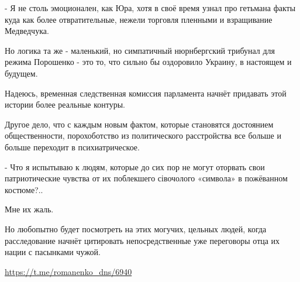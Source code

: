 - Я не столь эмоционален, как Юра, хотя в своё время узнал про гетьмана факты
куда как более отвратительные, нежели торговля пленными и взращивание
Медведчука.

Но логика та же - маленький, но симпатичный нюрнбергский трибунал для режима
Порошенко - это то, что сильно бы оздоровило Украину, в настоящем и будущем.

Надеюсь, временная следственная комиссия парламента начнёт придавать этой истории более реальные контуры. 

Другое дело, что с каждым новым фактом, которые становятся достоянием
общественности, порохоботство из политического расстройства все больше и больше
переходит в психиатрическое.

- Что я испытываю к людям, которые до сих пор не могут оторвать свои
патриотические чувства от их поблекшего сівочолого «символа» в пожёванном
костюме?..

Мне их жаль.

Но любопытно будет посмотреть на этих могучих, цельных людей, когда
расследование начнёт цитировать непосредственные уже переговоры отца их нации с
пасынками чужой.

\url{https://t.me/romanenko_dns/6940}

